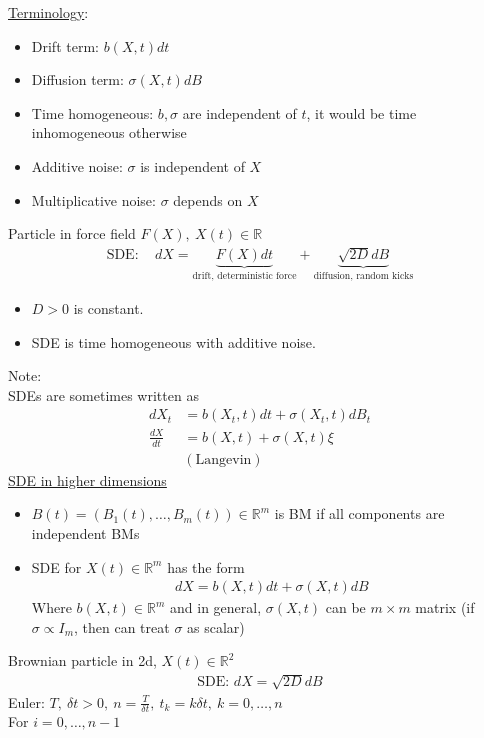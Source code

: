 \documentclass[12pt, letterpaper]{article}
\begin{document}
\underline{Terminology}:
\begin{itemize}
    \item Drift term: $b(X,t)dt$ 
    \item Diffusion term: $\sigma(X,t)dB$
    \item Time homogeneous: $b,\sigma$ are independent of $t$, it would be time inhomogeneous otherwise
    \item Additive noise: $\sigma$ is independent of $X$
    \item Multiplicative noise: $\sigma$ depends on $X$
\end{itemize}
 Particle in force field $F(X),\ X(t) \in \mathbb{R}$
\begin{align*}
    \text{SDE}:\quad dX = \underbrace{F(X)dt}_{\text{drift, deterministic force}} + \underbrace{\sqrt{2D}dB}_{\text{diffusion, random kicks}}
\end{align*}
\begin{itemize}
    \item $D > 0$ is constant.
    \item SDE is time homogeneous with additive noise.
\end{itemize}
Note: \\
SDEs are sometimes written as
\begin{align*}
    dX_t &= b(X_t,t)dt + \sigma(X_t,t)dB_t \\
    \frac{dX}{dt} &= b(X,t) + \sigma(X,t)\xi \\
    &(\text{Langevin})
\end{align*}
\underline{SDE in higher dimensions}
\begin{itemize}
    \item $B(t) = (B_1(t),\dots,B_m(t)) \in \mathbb{R}^m$ is BM if all components are independent BMs
    \item SDE for $X(t) \in \mathbb{R}^m$ has the form
    \begin{align*}
        dX = b(X,t)dt + \sigma(X,t)dB
    \end{align*} 
    Where $b(X,t) \in \mathbb{R}^m$ and in general, $\sigma(X,t)$ can be $m\times m $ matrix
    (if $\sigma \propto I_m$, then can treat $\sigma$ as scalar)
\end{itemize}
 Brownian particle in 2d, $X(t) \in \mathbb{R}^2$
\begin{align*}
    \text{SDE: } dX = \sqrt{2D} dB
\end{align*}
Euler: $T,\ \delta t > 0,\ n = \frac{T}{\delta t},\ t_k = k\delta t,\ k = 0,\dots,n$ \\
For $i = 0, \dots, n-1$
\end{document}
